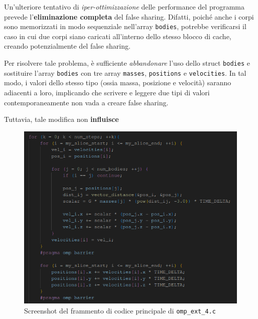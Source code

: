 \documentclass[12pt]{report}
\begin{document}
    Un'ulteriore tentativo di \textit{iper-ottimizzazione} delle performance del programma prevede l'\textbf{eliminazione completa} del false sharing. Difatti, poiché anche i corpi sono memorizzati in modo sequenziale nell'array \texttt{bodies}, potrebbe verificarsi il caso in cui due corpi siano caricati all'interno dello stesso blocco di cache, creando potenzialmente del false sharing.
    
    Per risolvere tale problema, è sufficiente \textit{abbandonare} l'uso dello struct \texttt{bodies} e sostituire l'array \texttt{bodies} con tre array \texttt{masses}, \texttt{positions} e \texttt{velocities}. In tal modo, i valori dello stesso tipo (ossia massa, posizione e velocità) saranno adiacenti a loro, implicando che scrivere e leggere due tipi di valori contemporaneamente non vada a creare false sharing.

    Tuttavia, tale modifica non \textbf{influisce}

    \begin{figure}[H]
        \centering
        \includegraphics[width=\textwidth]{images/omp_ext_4.png}
        \caption{Screenshot del frammento di codice principale di \texttt{omp\_ext\_4.c}}
        \label{fig:omp_ext_4}
    \end{figure}
\end{document}
